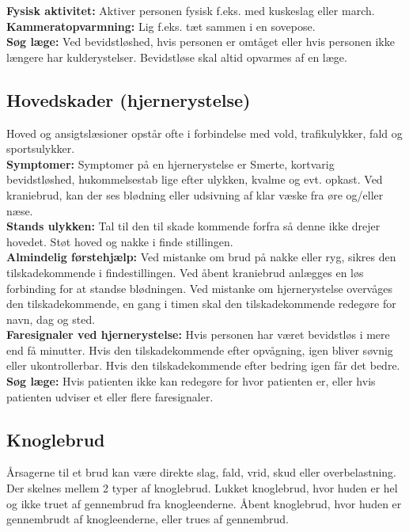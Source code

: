\documentclass[../../../main.tex]{subfiles}
\begin{document}
\begin{multicols}{2}
\textbf{Fysisk aktivitet:} Aktiver personen fysisk f.eks. med kuskeslag eller march.
\\

\textbf{Kammeratopvarmning:} Lig f.eks. tæt sammen i en sovepose.
\\

\textbf{Søg læge:} Ved bevidstløshed, hvis personen er omtåget eller hvis personen ikke længere har kulderystelser. Bevidstløse skal altid opvarmes af en læge. 
\\
\subsection*{Hovedskader (hjernerystelse)} Hoved og ansigtslæsioner opstår ofte i forbindelse med vold, trafikulykker, fald og sportsulykker.
\\

\textbf{Symptomer:} Symptomer på en hjernerystelse er Smerte, kortvarig
bevidstløshed, hukommelsestab lige efter ulykken, kvalme og evt. opkast. Ved kraniebrud, kan der ses blødning eller udsivning af klar væske fra øre og/eller næse.
\\

\textbf{Stands ulykken:} Tal til den til skade kommende forfra så denne ikke
drejer hovedet. Støt hoved og nakke i finde stillingen.
\\

\textbf{Almindelig førstehjælp:} Ved mistanke om brud på nakke eller ryg, sikres den tilskadekommende i findestillingen. Ved åbent kraniebrud anlægges en løs forbinding for at standse blødningen. Ved mistanke om hjernerystelse overvåges den tilskadekommende, en gang i timen skal den tilskadekommende redegøre for navn, dag og sted.
\\

\textbf{Faresignaler ved hjernerystelse:} Hvis personen har været bevidstløs i mere end få minutter. Hvis den tilskadekommende efter opvågning, igen
bliver søvnig eller ukontrollerbar. Hvis den tilskadekommende efter bedring igen får det bedre.
\\

\textbf{Søg læge:} Hvis patienten ikke kan redegøre for hvor patienten
er, eller hvis patienten udviser et eller flere faresignaler. 
\\
\subsection*{Knoglebrud} Årsagerne til et brud kan være direkte slag, fald, vrid, skud eller overbelastning. Der skelnes mellem 2 typer af knoglebrud. Lukket knoglebrud, hvor huden er hel og ikke truet af gennembrud fra knogleenderne. Åbent knoglebrud, hvor huden er gennembrudt af knogleenderne, eller trues af gennembrud.
\\


\end{multicols}
\end{document}
